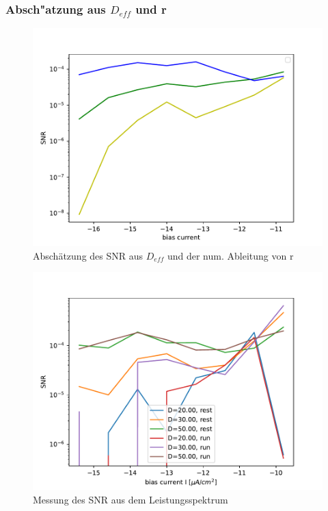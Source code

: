 \documentclass[12pt,a4paper]{article}
\begin{document}
\subsubsection{Absch"atzung aus $D_{eff}$ und r}
\begin{figure}[H]
	\centering
	\includegraphics[scale=1]{snrangerealrinzel.pdf}\caption{Abschätzung des SNR aus $D_{eff}$ und der num. Ableitung von r}
	\label{rinzelabsch}
\end{figure}
\begin{figure}[H]
	\centering
	\includegraphics[scale=1]{snronlyrinzel.pdf}\caption{Messung des SNR aus dem Leistungsspektrum}
	\label{rinzelmeas}
\end{figure}
\end{document}
